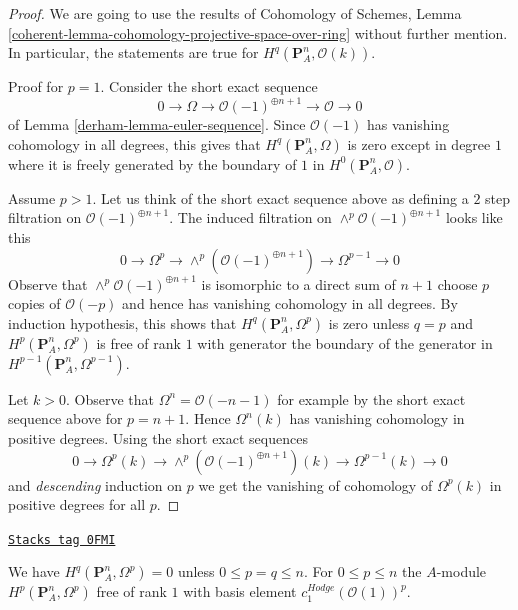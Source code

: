 \begin{proof}

We are going to use the results of Cohomology of Schemes, Lemma
\ref{coherent-lemma-cohomology-projective-space-over-ring}
without further mention. In particular, the statements are true
for $H^q(\mathbf{P}^n_A, \mathcal{O}(k))$.

\medskip\noindent
Proof for $p = 1$. Consider the short exact sequence
$$
0 \to \Omega \to \mathcal{O}(-1)^{\oplus n + 1} \to \mathcal{O} \to 0
$$
of Lemma \ref{derham-lemma-euler-sequence}. Since $\mathcal{O}(-1)$ has
vanishing cohomology in all degrees, this gives that
$H^q(\mathbf{P}^n_A, \Omega)$ is zero except in degree $1$
where it is freely generated by the boundary of $1$ in
$H^0(\mathbf{P}^n_A, \mathcal{O})$.

\medskip\noindent
Assume $p > 1$. Let us think of the short exact sequence
above as defining a $2$ step filtration on $\mathcal{O}(-1)^{\oplus n + 1}$.
The induced filtration on $\wedge^p\mathcal{O}(-1)^{\oplus n + 1}$ looks
like this
$$
0 \to \Omega^p \to \wedge^p\left(\mathcal{O}(-1)^{\oplus n + 1}\right)
\to \Omega^{p - 1} \to 0
$$
Observe that $\wedge^p\mathcal{O}(-1)^{\oplus n + 1}$ is isomorphic
to a direct sum of $n + 1$ choose $p$ copies of $\mathcal{O}(-p)$
and hence has vanishing cohomology in all degrees.
By induction hypothesis, this shows that $H^q(\mathbf{P}^n_A, \Omega^p)$
is zero unless $q = p$ and $H^p(\mathbf{P}^n_A, \Omega^p)$ is free
of rank $1$ with generator the boundary of the generator in
$H^{p - 1}(\mathbf{P}^n_A, \Omega^{p - 1})$.

\medskip\noindent
Let $k > 0$. Observe that $\Omega^n = \mathcal{O}(-n - 1)$ for example
by the short exact sequence above for $p = n + 1$.
Hence $\Omega^n(k)$ has vanishing cohomology in positive degrees.
Using the short exact sequences
$$
0 \to \Omega^p(k) \to \wedge^p\left(\mathcal{O}(-1)^{\oplus n + 1}\right)(k)
\to \Omega^{p - 1}(k) \to 0
$$
and {\it descending} induction on $p$ we get the vanishing of
cohomology of $\Omega^p(k)$ in positive degrees for all $p$.
\end{proof}

\begin{lemma}
\label{derham-lemma-hodge-cohomology-projective-space}
\href{https://stacks.math.columbia.edu/tag/0FMI}{\texttt{Stacks tag 0FMI}}

We have $H^q(\mathbf{P}^n_A, \Omega^p) = 0$
unless $0 \leq p = q \leq n$. For $0 \leq p \leq n$ the $A$-module
$H^p(\mathbf{P}^n_A, \Omega^p)$ free of rank $1$ with basis element
$c_1^{Hodge}(\mathcal{O}(1))^p$.
\end{lemma}

